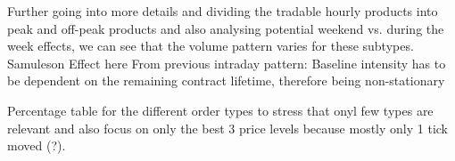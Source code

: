 \documentclass[12pt,a4paper]{cau_thesis}
\begin{document}
Further going into more details and dividing the tradable hourly
products into peak and off-peak products and also analysing potential
weekend vs. during the week effects, we can see that the volume
pattern varies for these subtypes. Samuleson Effect here From
previous intraday pattern: Baseline intensity has to be dependent on
the remaining contract lifetime, therefore being non-stationary

Percentage table for the different order types to stress that onyl
few types are relevant and also focus on only the best 3 price levels
because mostly only 1 tick moved (?).
\end{document}
